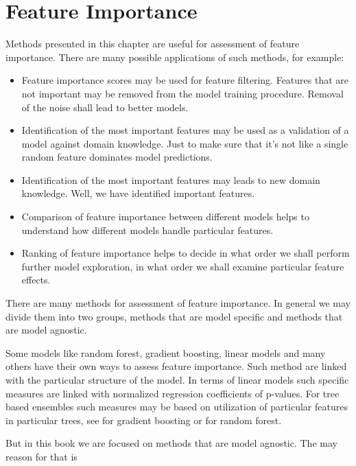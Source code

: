 \documentclass[12pt,]{krantz}
\providecommand{\tightlist}{%
  \setlength{\itemsep}{0pt}\setlength{\parskip}{0pt}}
\theoremstyle{definition}
\theoremstyle{definition}
\theoremstyle{definition}
\theoremstyle{remark}
\begin{document}
\hypertarget{variableImportance}{%
\section{Feature Importance}\label{variableImportance}}

Methods presented in this chapter are useful for assessment of feature
importance. There are many possible applications of such methods, for
example:

\begin{itemize}
\tightlist
\item
  Feature importance scores may be used for feature filtering. Features
  that are not important may be removed from the model training
  procedure. Removal of the noise shall lead to better models.
\item
  Identification of the most important features may be used as a
  validation of a model against domain knowledge. Just to make sure that
  it's not like a single random feature dominates model predictions.
\item
  Identification of the most important features may leads to new domain
  knowledge. Well, we have identified important features.
\item
  Comparison of feature importance between different models helps to
  understand how different models handle particular features.
\item
  Ranking of feature importance helps to decide in what order we shall
  perform further model exploration, in what order we shall examine
  particular feature effects.
\end{itemize}

There are many methods for assessment of feature importance. In general
we may divide them into two groups, methods that are model specific and
methods that are model agnostic.

Some models like random forest, gradient boosting, linear models and
many others have their own ways to assess feature importance. Such
method are linked with the particular structure of the model. In terms
of linear models such specific measures are linked with normalized
regression coefficients of p-values. For tree based ensembles such
measures may be based on utilization of particular features in
particular trees, see \citep{xgboostExplainer} for gradient boosting or
\citep{randomForestExplainer} for random forest.

But in this book we are focused on methods that are model agnostic. The
may reason for that is
\end{document}
